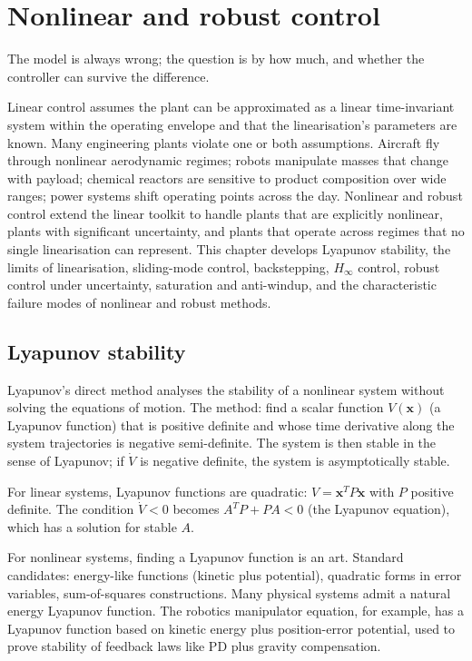 \chapter{Nonlinear and robust control}
\label{vol09:ch04}

\epigraph{The model is always wrong; the question is by how much, and whether the controller can survive the difference.}{}


\noindent
Linear control assumes the plant can be approximated as a linear time-invariant system within the operating envelope and that the linearisation's parameters are known. Many engineering plants violate one or both assumptions. Aircraft fly through nonlinear aerodynamic regimes; robots manipulate masses that change with payload; chemical reactors are sensitive to product composition over wide ranges; power systems shift operating points across the day. Nonlinear and robust control extend the linear toolkit to handle plants that are explicitly nonlinear, plants with significant uncertainty, and plants that operate across regimes that no single linearisation can represent. This chapter develops Lyapunov stability, the limits of linearisation, sliding-mode control, backstepping, $H_\infty$ control, robust control under uncertainty, saturation and anti-windup, and the characteristic failure modes of nonlinear and robust methods.

\section{Lyapunov stability}

Lyapunov's direct method analyses the stability of a nonlinear system without solving the equations of motion. The method: find a scalar function $V(\mathbf{x})$ (a Lyapunov function) that is positive definite and whose time derivative along the system trajectories is negative semi-definite. The system is then stable in the sense of Lyapunov; if $\dot{V}$ is negative definite, the system is asymptotically stable.

For linear systems, Lyapunov functions are quadratic: $V = \mathbf{x}^T P \mathbf{x}$ with $P$ positive definite. The condition $\dot{V} < 0$ becomes $A^T P + P A < 0$ (the Lyapunov equation), which has a solution for stable $A$.

For nonlinear systems, finding a Lyapunov function is an art. Standard candidates: energy-like functions (kinetic plus potential), quadratic forms in error variables, sum-of-squares constructions. Many physical systems admit a natural energy Lyapunov function. The robotics manipulator equation, for example, has a Lyapunov function based on kinetic energy plus position-error potential, used to prove stability of feedback laws like PD plus gravity compensation.

